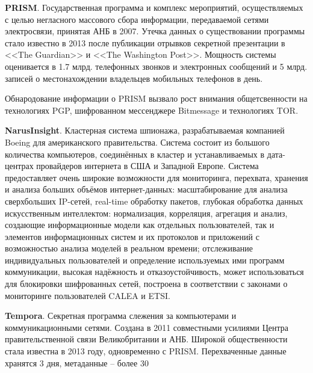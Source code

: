 	\textbf{PRISM}.  Государственная программа и 	комплекс мероприятий, осуществляемых с целью  негласного массового  сбора информации, передаваемой   сетями электросвязи, принятая АНБ в 2007. Утечка данных о существовании программы стало известно в 2013 после публикации отрывков секретной презентации в   <<The Guardian>> и <<The Washington Post>>. Мощность системы оценивается в 1.7 млрд. телефонных звонков и электронных сообщений и 5 млрд. записей о местонахождении владельцев мобильных телефонов в день.  %
	
	Обнародование информации о PRISM вызвало рост внимания общетсвенности на технологиях PGP, шифрованном мессенджере   Bitmessage и технологиях TOR. %
	
	
	\textbf{NarusInsight}. Кластерная система шпионажа, разрабатываемая компанией Boeing для американского правительства. %
	Система состоит из большого количества компьютеров, соединённых в кластер и устанавливаемых в дата-центрах провайдеров интернета в США и Западной Европе. Система предоставляет очень широкие возможности для мониторинга, перехвата, хранения и анализа больших объёмов интернет-данных: масштабирование для анализа  сверхбольших IP-сетей, real-time обработку пакетов,  глубокая обработка данных искусственным интеллектом: нормализация, корреляция, агрегация и анализ, создающие информационные модели как отдельных пользователей, так и элементов информационных систем и их протоколов и приложений с возможностью анализа моделей в реальном времени; отслеживание индивидуальных пользователей и определение используемых  ими программ коммуникации, высокая надёжность и отказоустойчивость, может использоваться для блокировки шифрованных сетей,  построена в соответствии с законами о мониторинге пользователей CALEA и ETSI.
	
	\textbf{Tempora}. Секретная программа слежения за компьютерами и коммуникационными сетями. Создана в 2011 совместными усилиями  Центра правительственной связи Великобритании и АНБ.	Широкой общественности стала известна в 2013 году, одновременно с PRISM. Перехваченные данные хранятся 3 дня, метаданные -- более 30 %
	
